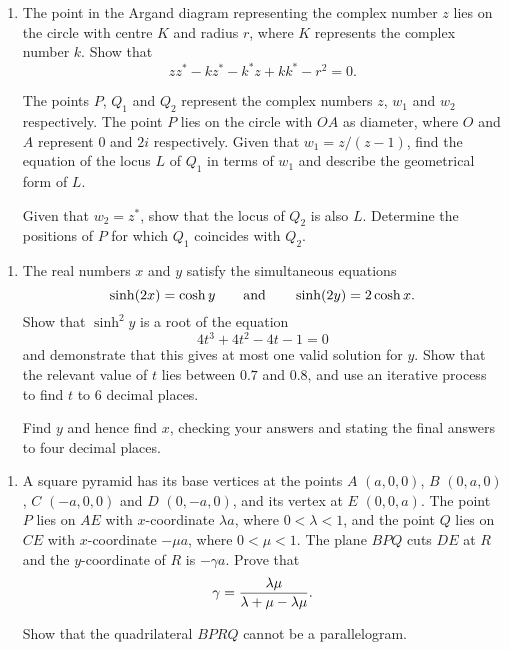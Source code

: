 \documentclass[a4, 11pt]{report}
\newlength{\qspace}
\newcounter{qnumber}
\newenvironment{question}%
 {\vspace{\qspace}
  \begin{enumerate}[\bfseries 1\quad][10]%
    \setcounter{enumi}{\value{qnumber}}%
    \item%
 }
{
  \end{enumerate}
  \filbreak
  \stepcounter{qnumber}
 }
\begin{document}
	\begin{question}
The point in the Argand diagram representing the complex number
$z$ lies on the circle with centre $K$ and radius $r$, where $K$
represents the complex number $k$. Show that 
$$
zz^* -kz^* -k^*z +kk^* -r^2 =0.
$$

The points $P$, $Q_1$ and $Q_2$ represent the complex numbers
$z$, $w_1$ and $w_2$ respectively. The point $P$ lies on the circle
with $OA$ as diameter, where $O$ and $A$ represent $0$ and 
$2i$ respectively. Given that $w_1=z/(z-1)$, find the equation of the 
locus $L$ of $Q_1$ in terms of $w_1$ and describe 
the geometrical form of $L$.

Given that $w_2=z^*$, show that the locus of $Q_2$ is also $L$. Determine the
positions of $P$ for which $Q_1$ coincides with $Q_2$.
	 \end{question}
	 
\begin{question}
The real numbers $x$ and $y$ satisfy the simultaneous equations
$$
\sinh (2x) = \cosh y
\qquad\hbox{and}\qquad
\sinh(2y) = 2 \cosh x.
$$
Show that $\sinh^2 y$ is a root of the equation
$$
4t^3 + 4t^2 -4t -1=0
$$
and demonstrate that this gives at most one valid solution for $y$. Show that
the relevant value of $t$ lies between $0.7$ and $0.8$, and use an
iterative process to find $t$ to 6 decimal places.

Find $y$ and hence find $x$, checking your answers and stating the final 
answers to four decimal places.
	\end{question}
	
	\begin{question}
A square pyramid has its base vertices at the points $A$ $(a,0,0)$,
$B$ $(0,a,0)$, $C$ $(-a,0,0)$ and $D$ $(0,-a,0)$, and its vertex at 
$E$ $(0,0,a)$. The point $P$ lies  on $AE$ with $x$-coordinate $\lambda a$,
where $0<\lambda<1$, and the point $Q$ lies on $CE$ with $x$-coordinate
$-\mu a$, where $0<\mu<1$. The plane $BPQ$ cuts $DE$
at $R$ and the $y$-coordinate of $R$ is $-\gamma a$. Prove that 
$$
\gamma = {\lambda \mu \over \lambda + \mu - \lambda \mu}.
$$

Show that the quadrilateral $BPRQ$ cannot be a parallelogram.
		\end{question}
		
\end{document}
